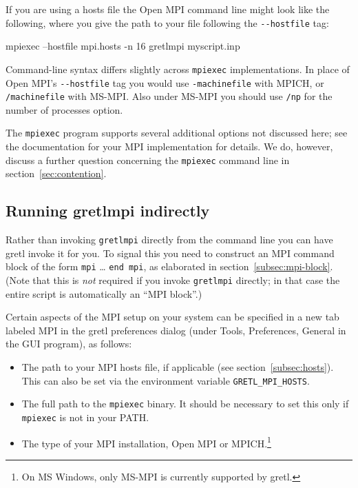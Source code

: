 \documentclass{article}
\begin{document}
If you are using a hosts file the \textsf{Open MPI} command line might
look like the following, where you give the path to your file
following the \verb|--hostfile| tag:
\begin{code}
mpiexec --hostfile mpi.hosts -n 16 gretlmpi myscript.inp
\end{code}

Command-line syntax differs slightly across \texttt{mpiexec}
implementations. In place of \textsf{Open MPI}'s \verb|--hostfile| tag
you would use \verb|-machinefile| with \textsf{MPICH}, or
\verb|/machinefile| with \textsf{MS-MPI}. Also under \textsf{MS-MPI}
you should use \texttt{/np} for the number of processes option.

The \texttt{mpiexec} program supports several additional options not
discussed here; see the documentation for your MPI implementation for
details. We do, however, discuss a further question concerning the
\texttt{mpiexec} command line in section~\ref{sec:contention}.

\subsection{Running gretlmpi indirectly}
\label{subsec:mpi-indirect}

Rather than invoking \texttt{gretlmpi} directly from the command
line you can have gretl invoke it for you. To signal this you need to
construct an MPI command block of the form \texttt{mpi} \dots{}
\texttt{end mpi}, as elaborated in
section~\ref{subsec:mpi-block}. (Note that this is \emph{not} required
if you invoke \texttt{gretlmpi} directly; in that case the entire
script is automatically an ``MPI block''.)

Certain aspects of the MPI setup on your system can be specified in a
new tab labeled \textsf{MPI} in the gretl preferences dialog (under
\textsf{Tools}, \textsf{Preferences}, \textsf{General} in the GUI
program), as follows:
\begin{itemize}
\item The path to your MPI hosts file, if applicable (see
  section~\ref{subsec:hosts}). This can also be set via the
  environment variable \verb|GRETL_MPI_HOSTS|.
\item The full path to the \texttt{mpiexec} binary. It should be
  necessary to set this only if \texttt{mpiexec} is not in your PATH.
\item The type of your MPI installation, \textsf{Open MPI} or
  \textsf{MPICH}.\footnote{On MS Windows, only \textsf{MS-MPI} is
    currently supported by gretl.}
\end{itemize}
\end{document}

